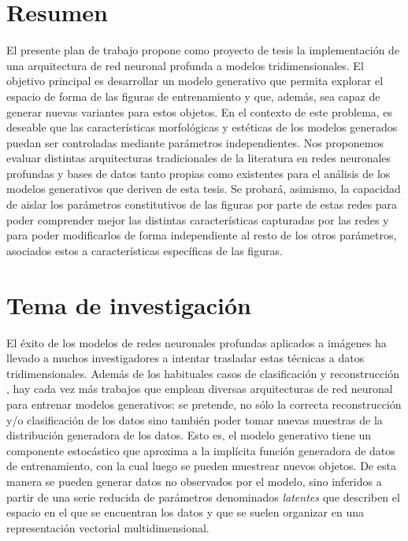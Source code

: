 \documentclass[spanish]{article}
\begin{document}



\section{Resumen}
El presente plan de trabajo propone como proyecto de tesis la implementación de una arquitectura de red neuronal
profunda a modelos tridimensionales. El objetivo principal es desarrollar un modelo generativo \cite{Foster2019}
que permita explorar el espacio de forma de las figuras de entrenamiento y que, además, sea capaz de generar
nuevas variantes para estos objetos. En el contexto de este problema, es deseable que las características
morfológicas y estéticas de los modelos generados puedan ser controladas mediante parámetros independientes. Nos
proponemos evaluar distintas arquitecturas tradicionales de la literatura en redes neuronales profundas y bases
de datos tanto propias como existentes \cite{G2L18} para el análisis de los modelos generativos que deriven de
esta tesis. Se probará, asimismo, la capacidad de aislar los parámetros constitutivos de las figuras por parte
de estas redes para poder comprender mejor las distintas características capturadas por las redes y para poder
modificarlos de forma independiente al resto de los otros parámetros, asociados estos a características
específicas de las figuras.

\section{Tema de investigación}
El éxito de los modelos de redes neuronales profundas aplicados a imágenes ha llevado a muchos investigadores a
intentar trasladar estas técnicas a datos tridimensionales. Además de los habituales casos de clasificación
\cite{qi2017pointnet, savva2016shrec16} y reconstrucción \cite{fan2017point, arsalan2017synthesizing}, hay cada
vez más trabajos \cite{riegler2017octnet, girdhar2016learning} que emplean diversas arquitecturas de red neuronal
para entrenar modelos generativos: se pretende, no sólo la correcta reconstrucción y/o clasificación de los datos
sino también poder tomar nuevas muestras de la distribución generadora de los datos. Esto es, el modelo
generativo tiene un componente estocástico que aproxima a la implícita función generadora de datos de
entrenamiento, con la cual luego se pueden muestrear nuevos objetos. De esta manera se pueden generar datos no
observados por el modelo, sino inferidos a partir de una serie reducida de parámetros denominados
\textit{latentes} que describen el espacio en el que se encuentran los datos y que se suelen organizar en una
representación vectorial multidimensional.
\end{document}
